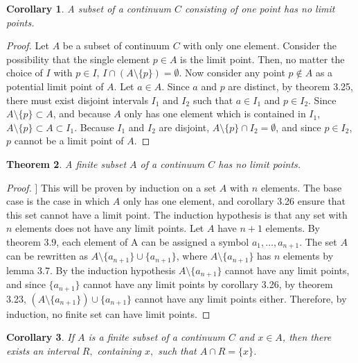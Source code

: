 \documentclass{amsart}
\newtheorem{theorem}{Theorem}
\newtheorem{corollary}[theorem]{Corollary}
\newcommand{\1}{\mathds{1}}
\numberwithin{equation}{section}
\numberwithin{theorem}{section}
\begin{document}
\begin{corollary}  A subset of a continuum $C$ consisting of one point has no limit points.
\end{corollary}

\begin{proof}
	Let $A$ be a subset of continuum $C$ with only one element.  Consider the possibility that the single element $p\in A$ is the limit point. Then, no matter the choice of $I$ with $p\in I$, $I\cap (A\setminus\{p\}) = \emptyset$. Now consider any point $p\notin A$ as a potential limit point of $A$. Let $a\in A$. Since $a$ and $p$ are distinct, by theorem 3.25, there must exist disjoint intervals $I_1$ and $I_2$ such that $a\in I_1$ and $p\in I_2$. Since $A\setminus\{p\}\subset A$, and because $A$ only has one element which is contained in $I_1$, $A\setminus\{p\}\subset A\subset I_1$. Because $I_1$ and $I_2$ are disjoint, $A\setminus\{p\}\cap I_2 = \emptyset$, and since $p\in I_2$, $p$ cannot be a limit point of $A$.
\end{proof}

\begin{theorem} A finite subset $A$ of a continuum $C$ has no limit points.
\end{theorem}

\begin{proof}]
	This will be proven by induction on a set $A$ with $n$ elements. The base case is the case in which $A$ only has one element, and corollary 3.26 ensure that this set cannot have a limit point. The induction hypothesis is that any set with $n$ elements does not have any limit points. Let $A$ have $n+1$ elements. By theorem 3.9, each element of A can be assigned a symbol $a_1, \dotsc, a_{n+1}$. The set $A$ can be rewritten as $A\setminus\{a_{n+1}\}\cup \{a_{n+1}\}$, where $A\setminus\{a_{n+1}\}$ has $n$ elements by lemma 3.7. By the induction hypothesis $A\setminus\{a_{n+1}\}$ cannot have any limit points, and since $\{a_{n+1}\}$ cannot have any limit points by corollary 3.26, by theorem 3.23, $(A\setminus\{a_{n+1}\})\cup \{a_{n+1}\}$ cannot have any limit points either. Therefore, by induction, no finite set can have limit points.
\end{proof}

\begin{corollary}  If $A$ is a finite subset of a continuum $C$ and $x \in A$, then there exists an interval $R,$ containing $x,$ such that $A \cap R = \{ x \}$.
\end{corollary}
\end{document}
